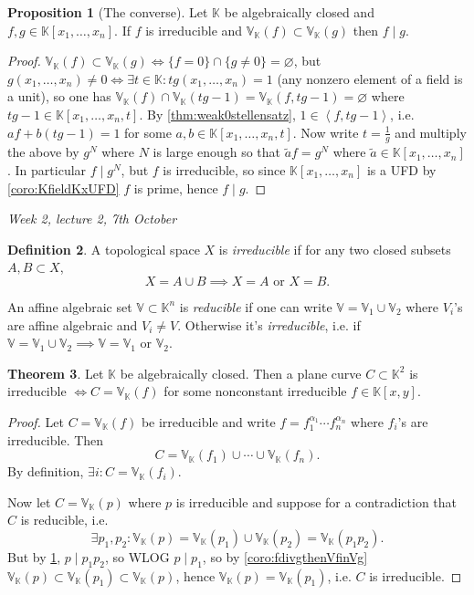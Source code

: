 \documentclass{article}
\newcommand{\K}{\mathbb{K}}
\newcommand{\V}{\mathbb{V}}
\newcommand{\la}{\left\langle}
\newcommand{\ra}{\right\rangle}
\theoremstyle{definition}
\newtheorem{defn}{Definition}[subsection]
\newtheorem{prop}[defn]{Proposition}
\newtheorem{thm}[defn]{Theorem}
\begin{document}
\begin{prop}[The converse]
\label{prop:VfinVgthenfdivg}
Let $\K$ be algebraically closed and $f,g\in\K[x_1,\ldots,x_n]$. If $f$ is irreducible and $\V_\K(f)\subset\V_\K(g)$ then $f\mid g$.
\end{prop}
\begin{proof}
$\V_\K(f)\subset\V_\K(g)\iff\{f=0\}\cap\{g\neq 0\}=\varnothing$, but $g(x_1,\ldots,x_n)\neq 0\iff\exists t\in\K:tg(x_1,\ldots,x_n)=1$ (any nonzero element of a field is a unit), so one has $\V_\K(f)\cap\V_\K(tg-1)=\V_\K(f,tg-1)=\varnothing$ where $tg-1\in\K[x_1,\ldots,x_n,t]$. By \ref{thm:weak0stellensatz}, $1\in\la f,tg-1\ra$, i.e. $af+b(tg-1)=1$ for some $a,b\in\K[x_1,\ldots,x_n,t]$. Now write $t=\frac1g$ and multiply the above by $g^N$ where $N$ is large enough so that $\widetilde a f=g^N$ where $\widetilde a\in\K[x_1,\ldots,x_n]$. In particular $f\mid g^N$, but $f$ is irreducible, so since $\K[x_1,\ldots,x_n]$ is a UFD by \ref{coro:KfieldKxUFD} $f$ is prime, hence $f\mid g$.
\end{proof}

\begin{flushright}
\textit{Week 2, lecture 2, 7th October}
\end{flushright}

\begin{defn}
\label{defn:irred}
A topological space $X$ is \textit{irreducible} if for any two closed subsets $A,B\subset X$,
\[
X=A\cup B\implies X=A\text{ or }X=B.
\]

An affine algebraic set $\V\subset\K^n$ is \textit{reducible} if one can write $\V=\V_1\cup\V_2$ where $V_i$'s are affine algebraic and $V_i\neq V$. Otherwise it's \textit{irreducible}, i.e. if $\V=\V_1\cup\V_2\implies \V=\V_1$ or $\V_2$.
\end{defn}

\begin{thm}
\label{thm:CisirrediffCisVKfwirredf}
Let $\K$ be algebraically closed. Then a plane curve $C\subset\K^2$ is irreducible $\iff C=\V_\K(f)$ for some nonconstant irreducible $f\in\K[x,y]$.
\end{thm}
\begin{proof}
Let $C=\V_\K(f)$ be irreducible and write $f=f_1^{\alpha_1}\cdots f_n^{\alpha_n}$ where $f_i$'s are irreducible. Then
\[
C=\V_\K(f_1)\cup\cdots\cup\V_\K(f_n).
\]
By definition, $\exists i:C=\V_\K(f_i)$.

Now let $C=\V_\K(p)$ where $p$ is irreducible and suppose for a contradiction that $C$ is reducible, i.e.
\[
\exists p_1,p_2:\V_\K(p)=\V_\K(p_1)\cup\V_\K(p_2)=\V_\K(p_1p_2).
\]
But by \ref{prop:VfinVgthenfdivg}, $p\mid p_1p_2$, so WLOG $p\mid p_1$, so by \ref{coro:fdivgthenVfinVg} $\V_\K(p)\subset\V_\K(p_1)\subset\V_\K(p)$, hence $\V_\K(p)=\V_\K(p_1)$, i.e. $C$ is irreducible.
\end{proof}
\end{document}
